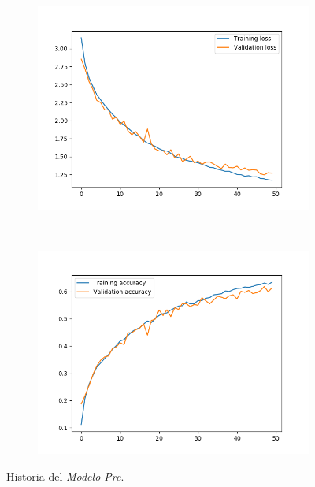 \documentclass[11pt,a4paper]{article}
\begin{document}
\begin{figure}[H]
  \centering
  \begin{subfigure}{.5\textwidth}
    \centering
    \includegraphics[scale=0.4]{img/batch-pre-loss.png}
    \label{fig:batch-pre-loss}
  \end{subfigure}%
  ~ \quad
  \begin{subfigure}{.5\textwidth}
    \centering
    \includegraphics[scale=0.4]{img/batch-pre-acc.png}
    \label{fig:batch-pre-acc}
  \end{subfigure}
  \caption{Historia del \textit{Modelo Pre}.}
  \label{fig:history-batch-pre}
\end{figure}
\end{document}
